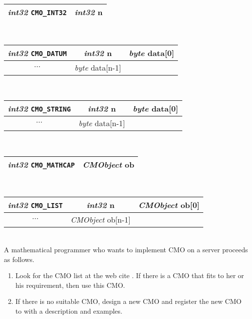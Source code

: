 \begin{tabular}{|c|c|}
\hline
{\sl int32} {\tt CMO\_INT32}& {\sl int32} {\rm n}  \\ 
\hline
\end{tabular} \\
\begin{tabular}{|c|c|c|}
\hline
{\sl int32} {\tt CMO\_DATUM}& {\sl int32} {\rm n} & {\sl byte} {\rm  data[0]} \\
\hline
$\cdots$ & {\sl byte} {\rm  data[n-1]} \\ 
\cline{1-2}
\end{tabular} \\
\begin{tabular}{|c|c|c|}
\hline
{\sl int32} {\tt CMO\_STRING}& {\sl int32} {\rm n} & {\sl byte} {\rm data[0]} \\
\hline
$\cdots$ & {\sl byte} {\rm data[n-1]} \\ 
\cline{1-2}
\end{tabular} \\
\begin{tabular}{|c|c|}
\hline
{\sl int32} {\tt CMO\_MATHCAP} & {\sl CMObject} {\rm ob} \\ 
\hline
\end{tabular} \\
\begin{tabular}{|c|c|c|}
\hline
{\sl int32} {\tt CMO\_LIST}& {\sl int32} {\rm n} & {\sl CMObject} {\rm ob[0]} \\
\hline
$\cdots$ & {\sl CMObject} {\rm ob[n-1]} \\ 
\cline{1-2}
\end{tabular} \\

A mathematical programmer who wants to implement CMO on a server proceeds 
as follows.
\begin{enumerate}
\item Look for the CMO list at the web cite \cite{openxm-web}.
If there is a CMO that fits to her or his requirement, then use this CMO.     
\item If there is no suitable CMO, design a new CMO and register 
the new CMO to \cite{openxm-web} with a description and examples.
\end{enumerate}
